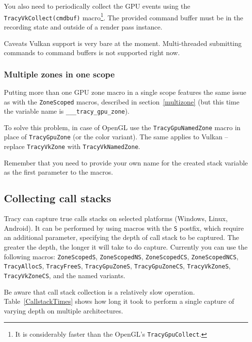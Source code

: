 \documentclass[hidelinks,titlepage,a4paper]{article}
\begin{document}
You also need to periodically collect the GPU events using the \texttt{TracyVkCollect(cmdbuf)} macro\footnote{It is considerably faster than the OpenGL's \texttt{TracyGpuCollect}.}. The provided command buffer must be in the recording state and outside of a render pass instance.

\begin{bclogo}[
noborder=true,
couleur=black!5,
logo=\bcattention
]{Caveats}
Vulkan support is very bare at the moment. Multi-threaded submitting commands to command buffers is not supported right now.
\end{bclogo}

\subsubsection{Multiple zones in one scope}

Putting more than one GPU zone macro in a single scope features the same issue as with the \texttt{ZoneScoped} macros, described in section~\ref{multizone} (but this time the variable name is \texttt{\_\_\_tracy\_gpu\_zone}).

To solve this problem, in case of OpenGL use the \texttt{TracyGpuNamedZone} macro in place of \texttt{TracyGpuZone} (or the color variant). The same applies to Vulkan -- replace \texttt{TracyVkZone} with \texttt{TracyVkNamedZone}.

Remember that you need to provide your own name for the created stack variable as the first parameter to the macros.

\subsection{Collecting call stacks}

Tracy can capture true calls stacks on selected platforms (Windows, Linux, Android). It can be performed by using macros with the \texttt{S} postfix, which require an additional parameter, specifying the depth of call stack to be captured. The greater the depth, the longer it will take to do capture. Currently you can use the following macros: \texttt{ZoneScopedS}, \texttt{ZoneScopedNS}, \texttt{ZoneScopedCS}, \texttt{ZoneScopedNCS}, \texttt{TracyAllocS}, \texttt{TracyFreeS}, \texttt{TracyGpuZoneS}, \texttt{TracyGpuZoneCS}, \texttt{TracyVkZoneS}, \texttt{TracyVkZoneCS}, and the named variants.

Be aware that call stack collection is a relatively slow operation. Table~\ref{CallstackTimes} shows how long it took to perform a single capture of varying depth on multiple architectures.
\end{document}
